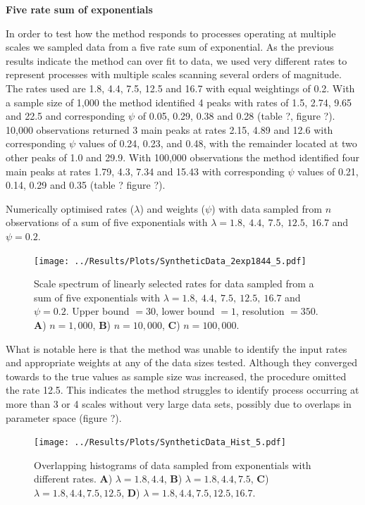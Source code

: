 \documentclass[11pt,usenames,dvipsnames,a4paper]{article}
\begin{document}
\noindent
\textbf{Five rate sum of exponentials}
\begin{linenumbers}

In order to test how the method responds to processes operating at multiple scales we sampled data from a five rate sum of exponential. As the previous results indicate the method can over fit to data, we used very different rates to represent processes with multiple scales scanning several orders of magnitude. The rates used are 1.8, 4.4, 7.5, 12.5 and 16.7 with equal weightings of 0.2. With a sample size of 1,000 the method identified 4 peaks with rates of 1.5, 2.74, 9.65 and 22.5 and corresponding $\psi$ of 0.05, 0.29, 0.38 and 0.28 (table ?, figure ?). 10,000 observations returned 3 main peaks at rates 2.15, 4.89 and 12.6 with corresponding $\psi$ values of 0.24, 0.23, and 0.48, with the remainder located at two other peaks of 1.0 and 29.9. With 100,000 observations the method identified four main peaks at rates 1.79, 4.3, 7.34 and 15.43 with corresponding $\psi$ values of 0.21, 0.14, 0.29 and 0.35 (table ? figure ?). 
\end{linenumbers}
\begin{table}[H]
	\centering
	\caption{Numerically optimised rates ($\lambda$) and weights ($\psi$) with data sampled from $n$ observations of a sum of five exponentials with $\lambda = 1.8,\ 4.4,\ 7.5,\ 12.5,\ 16.7$ and $\psi = 0.2$.}
	
\end{table}
\begin{figure}[H]
	\centering
	\texttt{[image: ../Results/Plots/SyntheticData\_2exp1844\_5.pdf]}
	\caption{Scale spectrum of linearly selected rates for data sampled from a sum of five exponentials with $\lambda = 1.8,\ 4.4,\ 7.5,\ 12.5,\ 16.7$ and $\psi = 0.2$. Upper bound $= 30$, lower bound $= 1$, resolution $= 350$. \textbf{A}) $n = 1,000$, \textbf{B}) $n = 10,000$,  \textbf{C}) $n = 100,000$.}
\end{figure}
\begin{linenumbers}

What is notable here is that the method was unable to identify the input rates and appropriate weights at any of the data sizes tested. Although they converged towards to the true values as sample size was increased, the procedure omitted the rate 12.5. This indicates the method struggles to identify process occurring at more than 3 or 4 scales without very large data sets, possibly due to overlaps in parameter space (figure ?).
\end{linenumbers}
\begin{figure}[H]
	\centering
	\texttt{[image: ../Results/Plots/SyntheticData\_Hist\_5.pdf]}
	\caption{Overlapping histograms of data sampled from exponentials with different rates. \textbf{A}) $\lambda = 1.8, 4.4$, \textbf{B}) $\lambda = 1.8, 4.4, 7.5$, \textbf{C}) $\lambda = 1.8, 4.4, 7.5, 12.5$, \textbf{D}) $\lambda = 1.8, 4.4, 7.5, 12.5, 16.7$.}
\end{figure}
\end{document}

